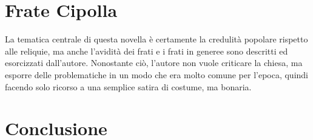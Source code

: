\documentclass[10pt,a4paper]{article}
\begin{document}
\section{Frate Cipolla}

La tematica centrale di questa novella è certamente la credulità popolare rispetto alle reliquie, ma anche l'avidità dei frati e i frati in generee sono descritti ed esorcizzati dall'autore. Nonostante ciò, l'autore non vuole criticare la chiesa, ma esporre delle problematiche in un modo che era molto comune per l'epoca, quindi facendo solo ricorso a una semplice satira di costume, ma bonaria.

\section{Conclusione}
\end{document}
